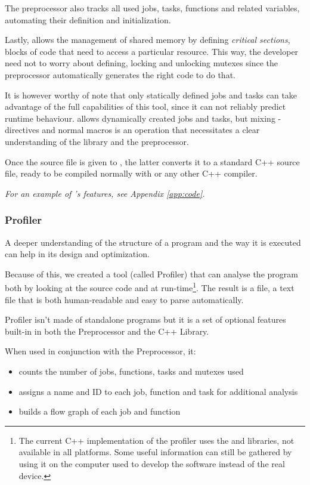   The preprocessor also tracks all used jobs, tasks, functions and
  related variables, automating their definition and initialization.
  
  Lastly,  allows the management of shared memory
  by defining \textit{critical sections}, blocks of code that need
  to access a particular resource. This way, the developer need not
  to worry about defining, locking and unlocking mutexes since the
  preprocessor automatically generates the right code to do that.
  
  It is however worthy of note that only statically defined jobs and
  tasks can take advantage of the full capabilities of this tool,
  since it can not reliably predict runtime behaviour. \ScheMo{} allows
  dynamically created jobs and tasks, but mixing
  -directives and normal macros is an operation that
  necessitates a clear understanding of the library and the
  preprocessor.
  
  Once the source file is given to , the latter
  converts it to a standard C++ source file, ready to be compiled
  normally with  or any other C++ compiler.
  
  \textit{For an example of \ScheMo{}'s features, see Appendix
  \ref{app:code}.}
  
\subsubsection{\ScheMo{} Profiler}
\label{sssec:schemoprofile}
  A deeper understanding of the structure of a \ScheMo{} program and the
  way it is executed can help in its design and optimization.

  Because of this, we created a tool (called \ScheMo{} Profiler) that can
  analyse the program both by looking at the source code and at
  run-time\footnote{The current C++ implementation of the profiler uses
  the  and  libraries, not available in all
  platforms. Some useful information can still be gathered by using it
  on the computer used to develop the software instead of the real
  device.}. The result is a  file, a text file that is
  both human-readable and easy to parse automatically.

  \ScheMo{} Profiler isn't made of standalone programs but it is
  a set of optional features built-in in both the \ScheMo{} Preprocessor
  and the \ScheMo{} C++ Library.
  
  When used in conjunction with the \ScheMo{} Preprocessor, it:
  \begin{itemize}
    \item counts the number of jobs, functions, tasks and mutexes used
    \item assigns a name and ID to each job, function and task for
      additional analysis
    \item builds a flow graph of each job and function
  \end{itemize}

